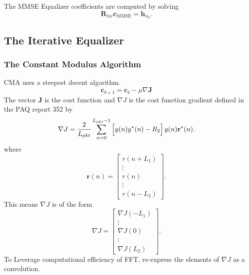 The MMSE Equalizer coefficients are computed by solving
\begin{equation}
\mathbf{R}_{hw}\mathbf{c}_\text{MMSE} = \mathbf{h}_{n_0}.
\label{eq:c_MMSE_solve}
\end{equation}
\clearpage
\subsection{The Iterative Equalizer}

\subsubsection{The Constant Modulus Algorithm}
CMA uses a steepest decent algorithm.
\begin{equation}
\mathbf{c}_{b+1} = \mathbf{c}_{b}-\mu \nabla \mathbf{J}
\end{equation}
The vector $\mathbf{J}$ is the cost function and $\nabla J$ is the cost function gradient defined in the PAQ report 352 by
\begin{equation}
	\nabla J = \frac{2}{L_{pkt}} \sum_{n=0}^{L_{pkt}-1}
	\left[ \vphantom{\displaystyle\sum}  y(n) y^\ast(n) - R_2 \right]
	y(n)  \mathbf{r}^\ast(n).
\label{eq:DelJcma-approxr}
\end{equation}
where
\begin{equation}
\mathbf{r}(n) = \begin{bmatrix} r(n+L_1) \\ \vdots \\ r(n) \\ \vdots \\ r(n-L_2) \end{bmatrix}.
\end{equation}
This means $\nabla J$ is of the form
\begin{equation}
\nabla J = \begin{bmatrix} \nabla J(-L_1) \\ \vdots \\ \nabla J(0) \\ \vdots \\ \nabla J(L_2) \end{bmatrix}.
\end{equation}
To Leverage computational efficiency of FFT, re-express the elements of $\nabla J$ as a convolution.

